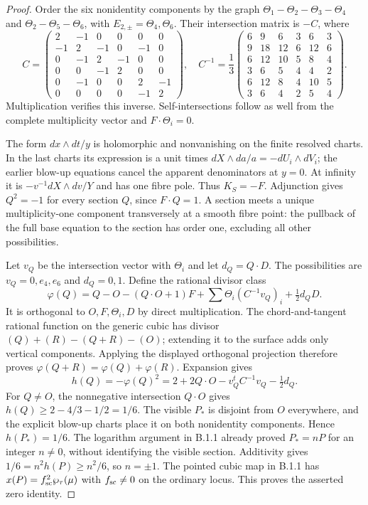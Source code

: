 \begin{proof}
Order the six nonidentity components by the graph
$\Theta_1-\Theta_2-\Theta_3-\Theta_4$ and $\Theta_2-\Theta_5-\Theta_6$, with $E_{2,\pm}=\Theta_4,\Theta_6$. Their intersection matrix is $-C$, where
\[
 C=\begin{pmatrix}2&-1&0&0&0&0\\-1&2&-1&0&-1&0\\0&-1&2&-1&0&0\\0&0&-1&2&0&0\\0&-1&0&0&2&-1\\0&0&0&0&-1&2\end{pmatrix},\quad
 C^{-1}=\frac13\begin{pmatrix}6&9&6&3&6&3\\9&18&12&6&12&6\\6&12&10&5&8&4\\3&6&5&4&4&2\\6&12&8&4&10&5\\3&6&4&2&5&4\end{pmatrix}.
\]
Multiplication verifies this inverse. Self-intersections follow as well from the complete multiplicity vector and $F\cdot\Theta_i=0$.

The form $dx\wedge dt/y$ is holomorphic and nonvanishing on the finite resolved charts. In the last charts its expression is a unit times $dX\wedge da/a=-dU_i\wedge dV_i$; the earlier blow-up equations cancel the apparent denominators at $y=0$. At infinity it is $-v^{-1}dX\wedge dv/Y$ and has one fibre pole. Thus $K_S=-F$. Adjunction gives $Q^2=-1$ for every section $Q$, since $F\cdot Q=1$. A section meets a unique multiplicity-one component transversely at a smooth fibre point: the pullback of the full base equation to the section has order one, excluding all other possibilities.

Let $v_Q$ be the intersection vector with $\Theta_i$ and let $d_Q=Q\cdot D$. The possibilities are $v_Q=0,e_4,e_6$ and $d_Q=0,1$. Define the rational divisor class
\[
 \varphi(Q)=Q-O-(Q\cdot O+1)F+\sum\Theta_i(C^{-1}v_Q)_i+\tfrac12d_QD.
\]
It is orthogonal to $O,F,\Theta_i,D$ by direct multiplication. The chord-and-tangent rational function on the generic cubic has divisor $(Q)+(R)-(Q+R)-(O)$; extending it to the surface adds only vertical components. Applying the displayed orthogonal projection therefore proves $\varphi(Q+R)=\varphi(Q)+\varphi(R)$. Expansion gives
\[
 h(Q)=-\varphi(Q)^2=2+2Q\cdot O-v_Q^tC^{-1}v_Q-\tfrac12d_Q.
\]
For $Q\ne O$, the nonnegative intersection $Q\cdot O$ gives $h(Q)\ge2-4/3-1/2=1/6$. The visible $P_*$ is disjoint from $O$ everywhere, and the explicit blow-up charts place it on both nonidentity components. Hence $h(P_*)=1/6$. The logarithm argument in B.1.1 already proved $P_*=nP$ for an integer $n\ne0$, without identifying the visible section. Additivity gives $1/6=n^2h(P)\ge n^2/6$, so $n=\pm1$. The pointed cubic map in B.1.1 has $x(P)=f_{\rm sc}^2\wp_\tau(\mu)$ with $f_{\rm sc}\ne0$ on the ordinary locus. This proves the asserted zero identity.
\end{proof}

